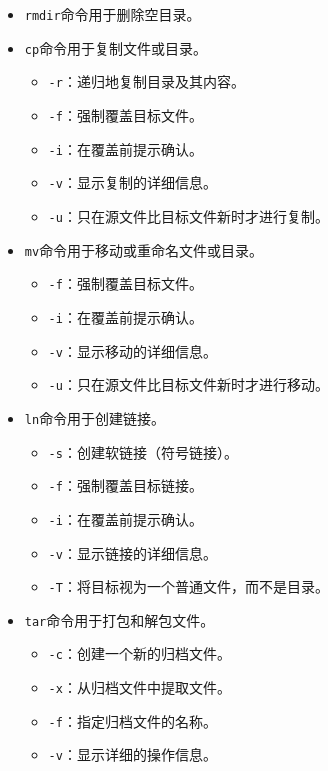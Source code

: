 \documentclass[../main.tex]{subfiles}
\begin{document}
\begin{itemize}
\begin{itemize}
\begin{itemize}
        \end{itemize}
      \item \texttt{rmdir}命令用于删除空目录。
      \item \texttt{cp}命令用于复制文件或目录。
        \begin{itemize}
          \item \texttt{-r}：递归地复制目录及其内容。
          \item \texttt{-f}：强制覆盖目标文件。
          \item \texttt{-i}：在覆盖前提示确认。
          \item \texttt{-v}：显示复制的详细信息。
          \item \texttt{-u}：只在源文件比目标文件新时才进行复制。
        \end{itemize}
      \item \texttt{mv}命令用于移动或重命名文件或目录。
        \begin{itemize}
          \item \texttt{-f}：强制覆盖目标文件。
          \item \texttt{-i}：在覆盖前提示确认。
          \item \texttt{-v}：显示移动的详细信息。
          \item \texttt{-u}：只在源文件比目标文件新时才进行移动。
        \end{itemize}
      \item \texttt{ln}命令用于创建链接。
        \begin{itemize}
          \item \texttt{-s}：创建软链接（符号链接）。
          \item \texttt{-f}：强制覆盖目标链接。
          \item \texttt{-i}：在覆盖前提示确认。
          \item \texttt{-v}：显示链接的详细信息。
          \item \texttt{-T}：将目标视为一个普通文件，而不是目录。
        \end{itemize}
      \item \texttt{tar}命令用于打包和解包文件。
        \begin{itemize}
          \item \texttt{-c}：创建一个新的归档文件。
          \item \texttt{-x}：从归档文件中提取文件。
          \item \texttt{-f}：指定归档文件的名称。
          \item \texttt{-v}：显示详细的操作信息。

\end{itemize}
\end{itemize}
\end{itemize}
\end{document}
